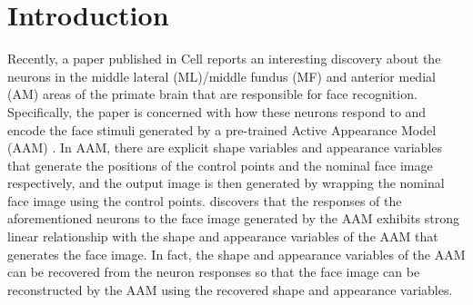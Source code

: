 \documentclass{article}
\begin{document}
\section{Introduction}


Recently, a paper published in Cell \cite{chang2017code} reports an interesting discovery about the neurons in the middle lateral (ML)/middle fundus (MF) and anterior medial (AM) areas of the primate brain that are responsible for face recognition. Specifically, the paper is concerned with how these neurons respond to and encode the face stimuli generated by a pre-trained  Active Appearance Model (AAM) \cite{cootes2001active,cootes2015active}.  In AAM, there are explicit shape variables and appearance variables  that generate the positions of the control points and the nominal face image respectively, and the output image is then generated by wrapping the nominal face image using the control points.  \cite{chang2017code}  discovers that the responses of the aforementioned neurons  to the face image generated by the AAM exhibits strong linear relationship with the shape and appearance variables  of the AAM that generates the face image. In fact, the shape and appearance variables of the AAM can be recovered from the neuron responses so that the face image can be reconstructed by the AAM using the recovered shape and appearance variables. 

 
\end{document}
